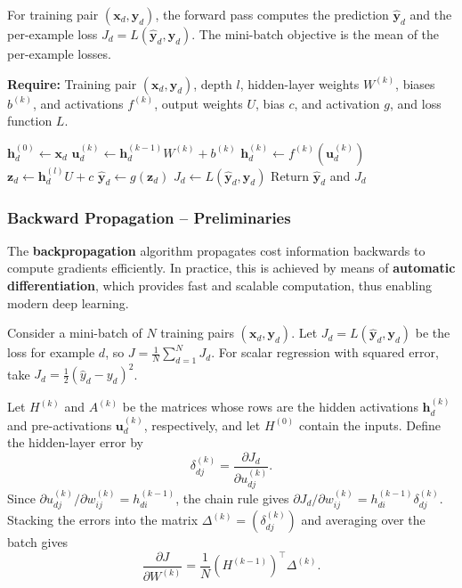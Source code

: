 For training pair $(\bm{x}_d,\bm{y}_d)$, the forward pass computes the prediction $\hat{\bm{y}}_d$ and the per-example loss $J_d=L(\hat{\bm{y}}_d,\bm{y}_d)$. The mini-batch objective is the mean of the per-example losses.

\begin{algorithm}[H]
	\caption{Forward Propagation}
	\textbf{Require:} Training pair $(\bm{x}_d,\bm{y}_d)$, depth $l$, hidden-layer weights $W^{(k)}$, biases $b^{(k)}$, and activations $f^{(k)}$, output weights $U$, bias $c$, and activation $g$, and loss function $L$.\\
	\begin{algorithmic}[1]
		\State $\bm{h}_d^{(0)} \gets \bm{x}_d$
			\State $\bm{u}_d^{(k)} \gets \bm{h}_d^{(k-1)}W^{(k)} + b^{(k)}$
			\State $\bm{h}_d^{(k)} \gets f^{(k)}(\bm{u}_d^{(k)})$
		\EndFor
		\State $\bm{z}_d \gets \bm{h}_d^{(l)}U+c$
		\State $\hat{\bm{y}}_d \gets g(\bm{z}_d)$
		\State $J_d \gets L(\hat{\bm{y}}_d,\bm{y}_d)$
		\State Return $\hat{\bm{y}}_d$ and $J_d$
	\end{algorithmic}
\end{algorithm}

\subsubsection{Backward Propagation – Preliminaries}

The \textbf{backpropagation} algorithm propagates cost information backwards to compute gradients efficiently. In practice, this is achieved by means of \textbf{automatic differentiation}, which provides fast and scalable computation, thus enabling modern deep learning.

Consider a mini-batch of $N$ training pairs $(\bm{x}_d,\bm{y}_d)$. Let $J_d=L(\hat{\bm{y}}_d,\bm{y}_d)$ be the loss for example $d$, so $J=\frac{1}{N}\sum_{d=1}^N J_d$. For scalar regression with squared error, take $J_d=\frac12(\hat{y}_d-y_d)^2$.

Let $H^{(k)}$ and $A^{(k)}$ be the matrices whose rows are the hidden activations $\bm{h}_d^{(k)}$ and pre-activations $\bm{u}_d^{(k)}$, respectively, and let $H^{(0)}$ contain the inputs. Define the hidden-layer error by
\[
    \delta_{dj}^{(k)}=\frac{\partial J_d}{\partial u_{dj}^{(k)}}.
\]
Since $\partial u_{dj}^{(k)}/\partial w_{ij}^{(k)}=h_{di}^{(k-1)}$, the chain rule gives $\partial J_d/\partial w_{ij}^{(k)}=h_{di}^{(k-1)}\delta_{dj}^{(k)}$. Stacking the errors into the matrix $\Delta^{(k)}=(\delta_{dj}^{(k)})$ and averaging over the batch gives
\begin{equation}
    \frac{\partial J}{\partial W^{(k)}}=\frac{1}{N}(H^{(k-1)})^\top\Delta^{(k)}.
\end{equation}

